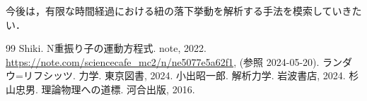 \documentclass[paper=a4,fontsize=11pt,lualatex]{jlreq}
\begin{document}
今後は，有限な時間経過における紐の落下挙動を解析する手法を模索していきたい．

\begin{thebibliography}{99}
 Shiki. N重振り子の運動方程式. note, 2022. \url{https://note.com/sciencecafe_mc2/n/ne5077e5a62f1}, (参照 2024-05-20).
 ランダウ=リフシッツ. 力学. 東京図書, 2024.
 小出昭一郎. 解析力学. 岩波書店, 2024.
 杉山忠男. 理論物理への道標. 河合出版, 2016.
\end{thebibliography}
\end{document}
